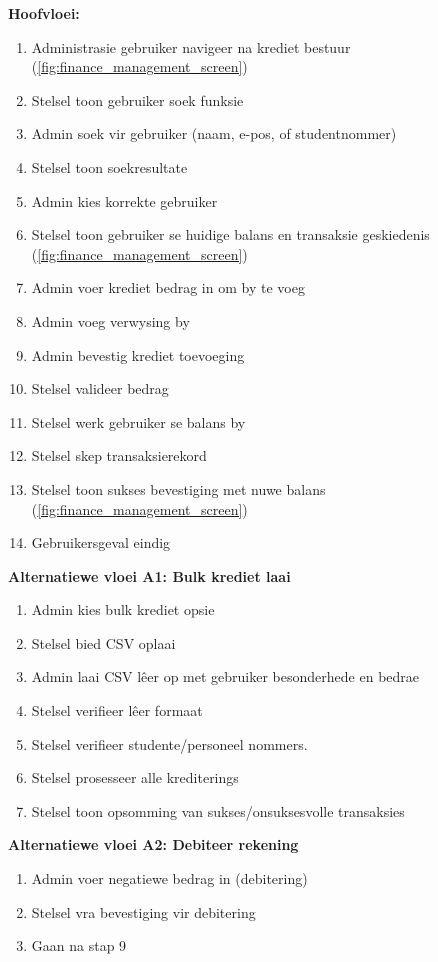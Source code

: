 \textbf{Hoofvloei:}
\begin{enumerate}
    \item Administrasie gebruiker navigeer na krediet bestuur (\autoref{fig:finance_management_screen})
    \item Stelsel toon gebruiker soek funksie
    \item Admin soek vir gebruiker (naam, e-pos, of studentnommer)
    \item Stelsel toon soekresultate
    \item Admin kies korrekte gebruiker
    \item Stelsel toon gebruiker se huidige balans en transaksie geskiedenis (\autoref{fig:finance_management_screen})
    \item Admin voer krediet bedrag in om by te voeg
    \item Admin voeg verwysing by
    \item Admin bevestig krediet toevoeging
    \item Stelsel valideer bedrag
    \item Stelsel werk gebruiker se balans by
    \item Stelsel skep transaksierekord
    \item Stelsel toon sukses bevestiging met nuwe balans (\autoref{fig:finance_management_screen})
    \item Gebruikersgeval eindig
\end{enumerate}

\textbf{Alternatiewe vloei A1: Bulk krediet laai}
\begin{enumerate}
    \item[3a.] Admin kies bulk krediet opsie
    \item Stelsel bied CSV oplaai
    \item Admin laai CSV lêer op met gebruiker besonderhede en bedrae
    \item Stelsel verifieer lêer formaat
    \item Stelsel verifieer studente/personeel nommers.
    \item Stelsel prosesseer alle krediterings
    \item Stelsel toon opsomming van sukses/onsuksesvolle transaksies
\end{enumerate}

\textbf{Alternatiewe vloei A2: Debiteer rekening}
\begin{enumerate}
    \item[7a.] Admin voer negatiewe bedrag in (debitering)
    \item Stelsel vra bevestiging vir debitering
    \item Gaan na stap 9
\end{enumerate}

